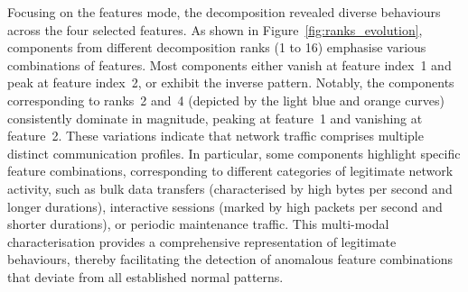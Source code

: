 \documentclass{ieeeaccess}
\begin{document}
Focusing on the features mode, the decomposition revealed diverse behaviours across the four selected features. As shown in Figure~\ref{fig:ranks_evolution}, components from different decomposition ranks (1 to 16) emphasise various combinations of features. Most components either vanish at feature index~1 and peak at feature index~2, or exhibit the inverse pattern. Notably, the components corresponding to ranks~2 and~4 (depicted by the light blue and orange curves) consistently dominate in magnitude, peaking at feature~1 and vanishing at feature~2. These variations indicate that network traffic comprises multiple distinct communication profiles. In particular, some components highlight specific feature combinations, corresponding to different categories of legitimate network activity, such as bulk data transfers (characterised by high bytes per second and longer durations), interactive sessions (marked by high packets per second and shorter durations), or periodic maintenance traffic. This multi-modal characterisation provides a comprehensive representation of legitimate behaviours, thereby facilitating the detection of anomalous feature combinations that deviate from all established normal patterns.
\end{document}
